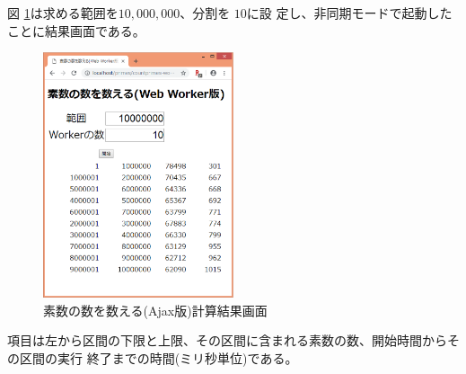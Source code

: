 \begin{Exec}
図 \ref{countPrimes-Ajax-res}は求める範囲を$10,000,000$、分割を $10$に設
 定し、非同期モードで起動したことに結果画面である。
 \begin{figure}[ht]
	\begin{center}
	 \includegraphics[width=0.5\textwidth]{primes/countPrimes-res.eps}
	\end{center}
 \caption{素数の数を数える(Ajax版)計算結果画面}\label{countPrimes-Ajax-res}
 \end{figure}

 項目は左から区間の下限と上限、その区間に含まれる素数の数、開始時間からその区間の実行
 終了までの時間(ミリ秒単位)である。
 

\end{Exec}
